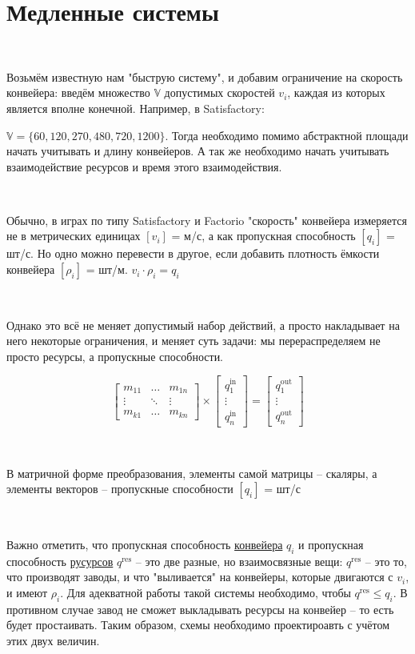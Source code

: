 \chapter{Медленные системы}

\

Возьмём известную нам "быструю систему", и добавим ограничение на скорость конвейера: введём множество $\mathbb{V}$  допустимых скоростей $v_i$, каждая из которых является вполне конечной. Например, в Satisfactory: 

\noindent $\mathbb{V} = \{60, 120, 270, 480, 720, 1200\}$. Тогда необходимо помимо абстрактной площади начать учитывать и длину конвейеров. А так же необходимо начать учитывать взаимодействие ресурсов и время этого взаимодействия.

\

Обычно, в играх по типу Satisfactory и Factorio "скорость" конвейера измеряется не в метрических единицах $[v_i]$ = м/с, а как пропускная способность $[q_i]$ = шт/с. Но одно можно перевести в другое, если добавить плотность ёмкости конвейера $[\rho_i]$ = шт/м. $v_i \cdot \rho_i = q_i$

\

Однако это всё не меняет допустимый набор действий, а просто накладывает на него некоторые ограничения, и меняет суть задачи: мы перераспределяем не просто ресурсы, а пропускные способности.

$$
\left[
\begin{matrix}
	m_{11} & \ldots & m_{1n} \\
	\vdots & \ddots & \vdots \\
	m_{k1} & \ldots & m_{kn}
\end{matrix}
\right]
\times
\left[
\begin{matrix}
	q^{\text{in}}_1 \\
	\vdots \\
	q^{\text{in}}_n
\end{matrix}
\right]
=
\left[
\begin{matrix}
	q^{\text{out}}_1 \\
	\vdots \\
	q^{\text{out}}_n
\end{matrix}
\right]
$$

\

В матричной форме преобразования, элементы самой матрицы -- скаляры, а элементы векторов -- пропускные способности $[q_i]$ = шт/с

\

Важно отметить, что пропускная способность \underline{конвейера} $q_i$ и пропускная способность \underline{русурсов} $q^{\text{res}}$ -- это две разные, но взаимосвязные вещи: $q^{\text{res}}$ -- это то, что производят заводы, и что "выливается" на конвейеры, которые двигаются с $v_i$, и имеют $\rho_i$. Для адекватной работы такой системы необходимо, чтобы $q^{\text{res}} \le q_i$. В противном случае завод не сможет выкладывать ресурсы на конвейер -- то есть будет простаивать. Таким образом, схемы необходимо проектироавть с учётом этих двух величин.

